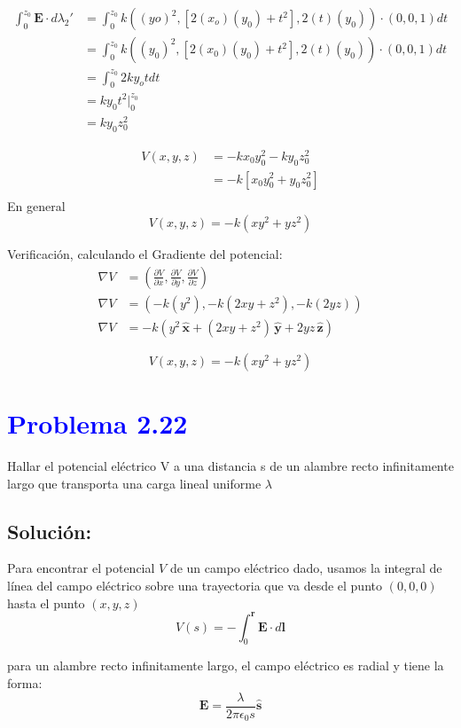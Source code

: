 \documentclass[12pt]{article}
\newcommand{\question}[1]{\textcolor{blue}{\textbf{#1}}}
\begin{document}
\begin{align*}
    \int_0^{z_0} \mathbf{E}\cdot d \lambda_2'& =  \int_0^{z_0} k((yo)^2,[2(x_o)(y_0) + t^2],2(t)(y_0)) \cdot (0,0,1)dt\\
& = \int_0^{z_0} k((y_0)^2,[2(x_0)(y_0) + t^2],2(t)(y_0)) \cdot (0,0,1)dt\\
& = \int_0^{z_0} 2ky_o t dt\\
& = ky_0 t^2 \bigg|_0^{z_0} \\
& = ky_0 z_0^2
\end{align*}

\begin{align*}
    V(x,y,z)& = -kx_0 y_0^2 - ky_0 z_0^2\\
& =-k[x_0y_0^2 + y_0z_0^2] \\
\end{align*}
En general 
\[\boxed{ V(x,y,z) = -k(xy^2 + yz^2)}\]


Verificación, calculando el Gradiente del potencial:
\begin{align*}
    \nabla V & = \left(\frac{\partial V}{\partial x}, \frac{\partial V}{\partial y}, \frac{\partial V}{\partial z}\right) \\
    \nabla V & = \left(-k(y^2), -k(2xy + z^2), -k(2yz)\right) \\
    \nabla V  & = -k\left(y^2\,\hat{\mathbf{x}} + (2xy + z^2)\,\hat{\mathbf{y}} + 2yz\,\hat{\mathbf{z}}\right) 
\end{align*}

\[
    \boxed{V(x,y,z) = -k(xy^2 + yz^2)}
\]


\section*{\question{ Problema 2.22}} Hallar el potencial eléctrico V a una distancia s de un alambre recto infinitamente largo que transporta una carga lineal uniforme \(\lambda\)

\subsection*{Solución:}
Para encontrar el potencial \(V\) de un campo eléctrico dado,  usamos la integral de línea del campo eléctrico sobre una trayectoria que va desde el punto \((0,0,0)\) hasta el punto \((x,y,z)\)
\[
{V(s)} = -\int_{0}^{\mathbf{r}} \mathbf{E}\cdot d \mathbf{l}   
\]    

para un alambre recto infinitamente largo, el campo eléctrico es radial y tiene la forma:
\[
\mathbf{E} = \frac{\lambda}{2\pi \epsilon_0 s} \hat{\mathbf{s}}
\]
\end{document}

